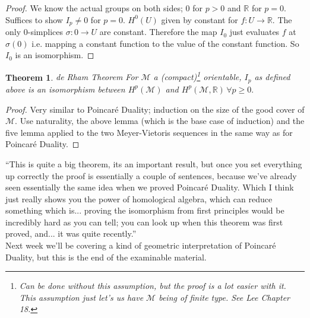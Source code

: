 \documentclass[10pt]{article}
\theoremstyle{plain}
\newtheorem{theorem}{Theorem}[section]
\theoremstyle{definition}
\newcommand{\Real}{\mathbb{R}}
\newcommand{\man}{\mathcal{M}}
\begin{document}
\begin{proof}
    We know the actual groups on both sides; 0 for $p >0$ and $\Real$ for $p =0$. Suffices to show $I_p\neq 0$ for $p=0$. $H^0(U)$ given by constant for $f:U\to\Real$. The only 0-simplices $\sigma : {0} \to U$ are constant. Therefore the map $I_0$ just evaluates $f$ at $\sigma(0)$ i.e. mapping a constant function to the value of the constant function. So $I_0$ is an isomorphism.
\end{proof}

\begin{theorem}{de Rham Theorem}
    For $\man$ a (compact)\footnote{Can be done without this assumption, but the proof is a lot easier with it. This assumption just let's us have $\man$ being of finite type. See Lee Chapter 18.} orientable, $I_p$ as defined above is an isomorphism between $H^p(\man)$ and $H^p(\man,\Real) \,\forall p\geq 0.$
\end{theorem}

\begin{proof}
    Very similar to Poincar\'e Duality; induction on the size of the good cover of $\man$. Use naturality, the above lemma (which is the base case of induction) and the five lemma applied to the two Meyer-Vietoris sequences in the same way as for Poincar\'e Duality.
\end{proof}
``This is quite a big theorem, its an important result, but once you set everything up correctly the proof is essentially a couple of sentences, because we've already seen essentially the same idea when we proved Poincar\'e Duality. Which I think just really shows you the power of homological algebra, which can reduce something which is... proving the isomorphism from first principles would be incredibly hard as you can tell; you can look up when this theorem was first proved, and... it was quite recently.''\\
Next week we'll be covering a kind of geometric interpretation of Poincar\'e Duality, but this is the end of the examinable material.

\end{document}
